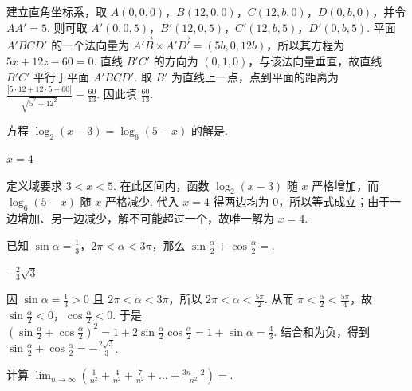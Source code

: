 \documentclass[UTF8,a4paper,oneside,11pt]{ctexbook}
\begin{document}
\begin{solution}
建立直角坐标系，取 \(A(0,0,0)\)，\(B(12,0,0)\)，\(C(12,b,0)\)，\(D(0,b,0)\)，并令 \(AA'=5\). 则可取 \(A'(0,0,5)\)，\(B'(12,0,5)\)，\(C'(12,b,5)\)，\(D'(0,b,5)\). 平面 \(A'BCD'\) 的一个法向量为 \(\overrightarrow{A'B}\times\overrightarrow{A'D'}=(5b,0,12b)\)，所以其方程为 \(5x+12z-60=0\). 直线 \(B'C'\) 的方向为 \((0,1,0)\)，与该法向量垂直，故直线 \(B'C'\) 平行于平面 \(A'BCD'\). 取 \(B'\) 为直线上一点，点到平面的距离为 \(\frac{|5\cdot12+12\cdot5-60|}{\sqrt{5^2+12^2}}=\frac{60}{13}\). 因此填 \(\frac{60}{13}\).
\end{solution}

\begin{problem}
方程 \(\log_2(x-3)=\log_6(5-x)\) 的解是\fillinblank{}.
\end{problem}

\begin{answer}
\(x=4\)
\end{answer}

\begin{solution}
定义域要求 \(3<x<5\). 在此区间内，函数 \(\log_2(x-3)\) 随 \(x\) 严格增加，而 \(\log_6(5-x)\) 随 \(x\) 严格减少. 代入 \(x=4\) 得两边均为 \(0\)，所以等式成立；由于一边增加、另一边减少，解不可能超过一个，故唯一解为 \(x=4\).
\end{solution}

\begin{problem}
已知 \(\sin \alpha=\frac{1}{3}\)，\(2\pi<\alpha<3\pi\)，那么 \(\sin \frac{\alpha}{2}+\cos \frac{\alpha}{2}=\)\fillinblank{}.
\end{problem}

\begin{answer}
\(-\frac{2}{3}\sqrt{3}\)
\end{answer}

\begin{solution}
因 \(\sin\alpha=\frac{1}{3}>0\) 且 \(2\pi<\alpha<3\pi\)，所以 \(2\pi<\alpha<\frac{5\pi}{2}\). 从而 \(\pi<\frac{\alpha}{2}<\frac{5\pi}{4}\)，故 \(\sin\frac{\alpha}{2}<0\)，\(\cos\frac{\alpha}{2}<0\). 于是 \(\left(\sin\frac{\alpha}{2}+\cos\frac{\alpha}{2}\right)^2=1+2\sin\frac{\alpha}{2}\cos\frac{\alpha}{2}=1+\sin\alpha=\frac{4}{3}\). 结合和为负，得到 \(\sin\frac{\alpha}{2}+\cos\frac{\alpha}{2}=-\frac{2\sqrt{3}}{3}\).
\end{solution}

\begin{problem}
计算 \(\displaystyle\lim_{n\to\infty}\left( \frac{1}{n^2}+\frac{4}{n^2}+\frac{7}{n^2}+\dots+\frac{3n-2}{n^2} \right)=\)\fillinblank{}.
\end{problem}
\end{document}
